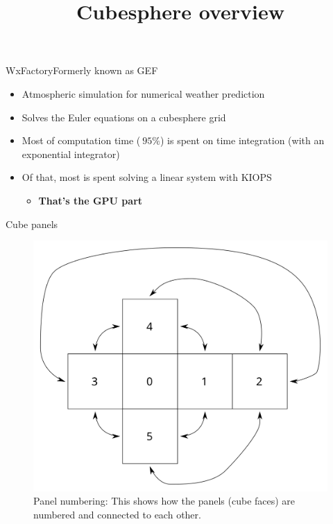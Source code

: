 \documentclass{beamer}
\title{Cubesphere overview}
\begin{document}
\begin{frame}
    \titlepage
\end{frame}

\begin{frame}{WxFactory}{Formerly known as GEF}
\begin{itemize}
    \item Atmospheric simulation for numerical weather prediction
    \item Solves the Euler equations on a cubesphere grid
    \item Most of computation time ($~95\%$) is spent on time
         integration (with an exponential integrator)
    \item Of that, most is spent solving a linear system with KIOPS
        \begin{itemize}
        \item \textbf{That's the GPU part}
        \end{itemize}
\end{itemize}
\end{frame}

\begin{frame}{Cube panels}
\begin{figure}
    \includegraphics[scale=0.5]{img/panel_numbering}
    \caption{Panel numbering: This shows how the panels (cube faces) are numbered and connected to each other.}
\end{figure}
\end{frame}
\end{document}

